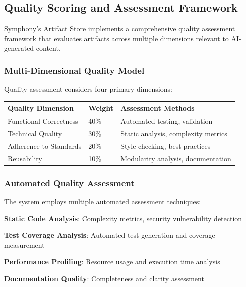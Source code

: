 \subsection*{Quality Scoring and Assessment Framework}

Symphony's Artifact Store implements a comprehensive quality assessment framework that evaluates artifacts across multiple dimensions relevant to AI-generated content.

\subsubsection*{Multi-Dimensional Quality Model}

Quality assessment considers four primary dimensions:

\begin{center}
\begin{tabular}{@{}lll@{}}
\toprule
\textbf{Quality Dimension} & \textbf{Weight} & \textbf{Assessment Methods} \\
\midrule
Functional Correctness & 40\% & Automated testing, validation \\
Technical Quality & 30\% & Static analysis, complexity metrics \\
Adherence to Standards & 20\% & Style checking, best practices \\
Reusability & 10\% & Modularity analysis, documentation \\
\bottomrule
\end{tabular}
\end{center}

\subsubsection*{Automated Quality Assessment}

The system employs multiple automated assessment techniques:

\begin{compactlist}
    \item \textbf{Static Code Analysis}: Complexity metrics, security vulnerability detection
    \item \textbf{Test Coverage Analysis}: Automated test generation and coverage measurement
    \item \textbf{Performance Profiling}: Resource usage and execution time analysis
    \item \textbf{Documentation Quality}: Completeness and clarity assessment
\end{compactlist}

